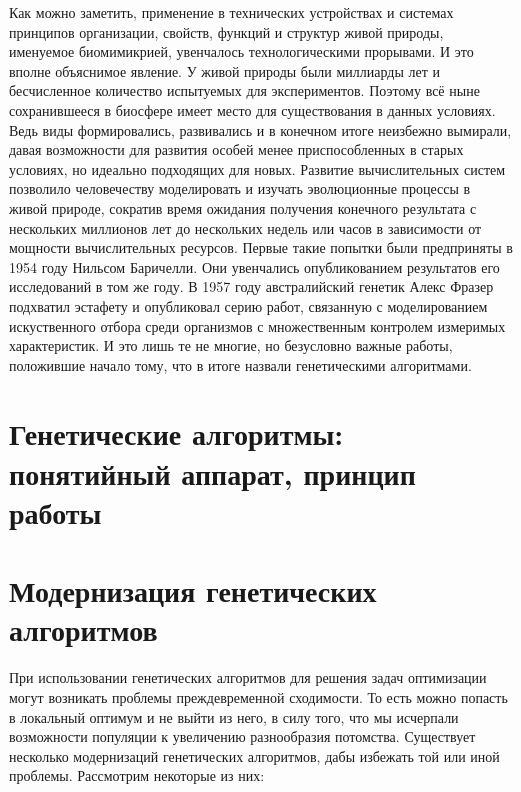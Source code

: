 Как можно заметить, применение в технических устройствах и системах принципов организации, свойств, функций и структур живой природы, именуемое биомимикрией, увенчалось технологическими прорывами. И это вполне объяснимое явление. У живой природы были миллиарды лет и бесчисленное количество испытуемых для экспериментов. Поэтому всё ныне сохранившееся в биосфере имеет место для существования в данных условиях. Ведь виды формировались, развивались и в конечном итоге неизбежно вымирали, давая возможности для развития особей менее приспособленных в старых условиях, но идеально подходящих для новых.
Развитие вычислительных систем позволило человечеству моделировать и изучать эволюционные процессы в живой природе, сократив время ожидания получения конечного результата с нескольких миллионов лет до нескольких недель или часов в зависимости от мощности вычислительных ресурсов. Первые такие попытки были предприняты в 1954 году Нильсом Баричелли. Они увенчались опубликованием результатов его исследований в том же году. В 1957 году австралийский генетик Алекс Фразер подхватил эстафету и опубликовал серию работ, связанную с моделированием искуственного отбора среди организмов с множественным контролем измеримых характеристик. И это лишь те не многие, но безусловно важные работы, положившие начало тому, что в итоге назвали генетическими алгоритмами.
\chapter{Генетические алгоритмы: понятийный аппарат, принцип работы}
\chapter{Модернизация генетических алгоритмов}
При использовании генетических алгоритмов для решения задач оптимизации могут возникать проблемы преждевременной сходимости. То есть можно попасть в локальный оптимум и не выйти из него, в силу того, что мы исчерпали возможности популяции к увеличению разнообразия потомства. Существует несколько модернизаций генетических алгоритмов, дабы избежать той или иной проблемы. Рассмотрим некоторые из них:

